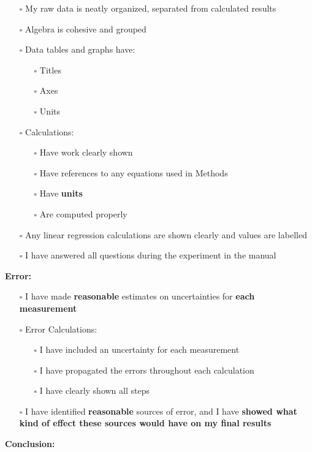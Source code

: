 \begin{itemize}
    \item[$\square$] My raw data is neatly organized, separated from calculated results
    \item[$\square$] Algebra is cohesive and grouped
    \item[$\square$] Data tables and graphs have:
	\begin{itemize}
	    \item[$\square$] Titles
	    \item[$\square$] Axes
	    \item[$\square$] Units
	\end{itemize}
    \item[$\square$] Calculations:
        \begin{itemize}
	    \item[$\square$] Have work clearly shown
	    \item[$\square$] Have references to any equations used in Methods
	    \item[$\square$] Have \textbf{units}
	    \item[$\square$] Are computed properly
	\end{itemize}
    \item[$\square$] Any linear regression calculations are shown clearly and values are labelled
    \item[$\square$] I have answered all questions during the experiment in the manual
\end{itemize}  
\textbf{Error:}
\begin{itemize}
    \item[$\square$] I have made \textbf{reasonable} estimates on uncertainties for \textbf{each measurement}
    \item[$\square$] Error Calculations:
        \begin{itemize}
	    \item[$\square$] I have included an uncertainty for each measurement
	    \item[$\square$] I have propagated the errors throughout each calculation
	    \item[$\square$] I have clearly shown all steps
	\end{itemize}
    \item[$\square$] I have identified \textbf{reasonable} sources of error, and I have \textbf{showed what kind of effect these sources would have on my final results}
\end{itemize}  
\textbf{Conclusion:}
